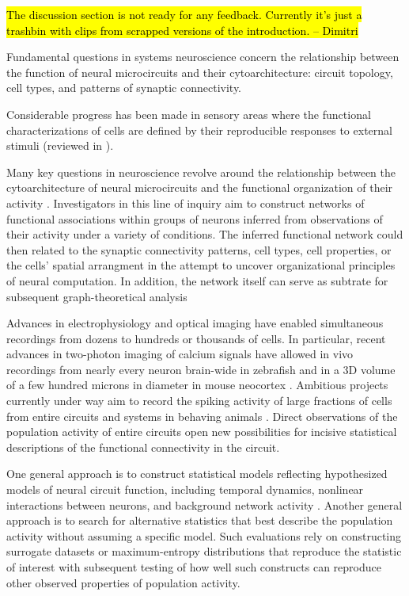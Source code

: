 \hl{The discussion section is not ready for any feedback. Currently it's just a trashbin with clips from scrapped versions of the introduction. -- Dimitri}

Fundamental questions in systems neuroscience concern the relationship between the function of neural microcircuits and their cytoarchitecture: circuit topology, cell types, and patterns of synaptic connectivity. 

Considerable progress has been made in sensory areas where the functional characterizations of cells are defined by their reproducible responses to external stimuli (reviewed in \citep{Reid:2012}). 

Many key questions in neuroscience revolve around the relationship between the cytoarchitecture of neural microcircuits and the functional organization of their activity \citep{Reid:2012}.  Investigators in this line of inquiry aim to construct networks of functional associations within groups of neurons inferred from observations of their activity under a variety of conditions.  The inferred functional network  could then related to the synaptic connectivity patterns, cell types, cell properties, or the cells' spatial arrangment in the attempt to uncover organizational principles of neural computation. In addition, the network itself can serve as subtrate for subsequent graph-theoretical analysis \citep{Feldt:2011}

Advances in electrophysiology and optical imaging have enabled simultaneous recordings from dozens to hundreds or thousands of cells. 
In particular, recent advances in two-photon imaging of calcium signals have allowed in vivo recordings from nearly every neuron brain-wide in zebrafish \citep{Leung:2013,Ahrens:2013} and in a 3D volume of a few hundred microns in diameter in mouse neocortex \citep{Katona:2012,Cotton:2013}.    
Ambitious projects currently under way aim to record the spiking activity of large fractions of cells from entire circuits and systems in behaving animals \citep{Alivisatos:2012}.  Direct observations of the population activity  of entire circuits open new possibilities for incisive statistical descriptions of the functional connectivity in the circuit.  


One general approach is to construct statistical models reflecting hypothesized models of neural circuit function, including temporal dynamics, nonlinear interactions between neurons, and background network activity \citep{Pillow:2008,Buonomano:2009,Yu:2009}. 
Another general approach is to search for alternative statistics that best describe the population activity without assuming a specific model.  Such evaluations rely on constructing surrogate datasets \citep{Okun:2012} or maximum-entropy distributions that reproduce the statistic of interest \citep{Ganmor:2011,Tkacik:2012} with subsequent testing of how well such constructs can reproduce other observed properties of population activity.


